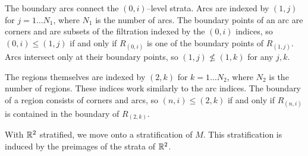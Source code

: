 The boundary arcs connect the $(0,i)$--level strata.
Arcs are indexed by $(1,j)$ for $j=1\dots N_1$, where $N_1$ is the number of arcs.
The boundary points of an arc are corners and are subsets of the filtration indexed by the $(0,i)$ indices, so $(0,i)\leq (1,j)$ if and only if $R_{(0,i)}$ is one of the boundary points of $R_{(1,j)}$.
Arcs intersect only at their boundary points, so $(1,j)\nleq(1,k)$ for any $j,k$. 

The regions themselves are indexed by $(2,k)$ for $k=1\dots N_2$, where $N_2$ is the number of regions.
These indices work similarly to the arc indices.
The boundary of a region consists of corners and arcs, so $(n,i)\leq(2,k)$ if and only if $R_{(n,i)}$ is contained in the boundary of $R_{(2,k)}$.

With $\mathbb{R}^2$ stratified, we move onto a stratification of $M$.
This stratification is induced by the preimages of the strata of $\mathbb{R}^2$.

%
%
%
%

